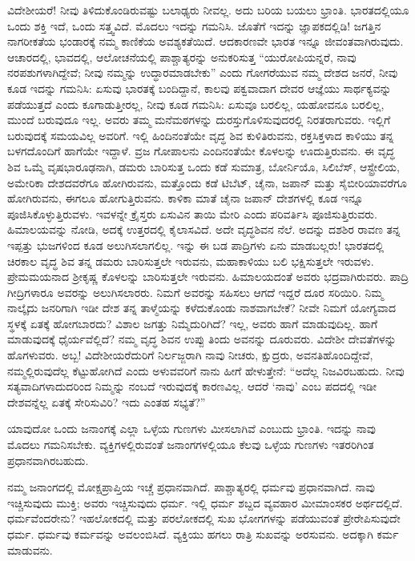 ವಿದೇಶೀಯರೆ! ನೀವು ತಿಳಿದುಕೊಂಡಿರುವಷ್ಟು ಬಲಾಢ್ಯರು ನೀವಲ್ಲ. ಅದು ಬರಿಯ ಬಯಲು ಭ್ರಾಂತಿ. ಭಾರತದಲ್ಲಿಯೂ ಒಂದು ಶಕ್ತಿ ಇದೆ, ಒಂದು ಸತ್ತ್ವವಿದೆ. ಮೊದಲು ಇದನ್ನು ಗಮನಿಸಿ. ಜೊತೆಗೆ ಇದನ್ನು ಜ್ಞಾಪಕದಲ್ಲಿಡಿ! ಜಗತ್ತಿನ ನಾಗರೀಕತೆಯ ಭಂಡಾರಕ್ಕೆ ನಮ್ಮ ಕಾಣಿಕೆಯ ಅವಶ್ಯಕತೆಯಿದೆ. ಆದಕಾರಣವೇ ಭಾರತ ಇನ್ನೂ ಜೀವಂತವಾಗಿರುವುದು. ಆಚಾರದಲ್ಲಿ, ಭಾವದಲ್ಲಿ, ಆಲೋಚನೆಯಲ್ಲಿ ಪಾಶ್ಚಾತ್ಯರನ್ನು ಅನುಕರಿಸುತ್ತ “ಯುರೋಪಿ\break ಯನ್ನರೆ, ನಾವು ನರಪಶುಗಳಾಗಿದ್ದೇವೆ; ನೀವು ನಮ್ಮನ್ನು ಉದ್ಧಾರಮಾಡಬೇಕು” ಎಂದು ಗೋಗರೆಯುವ ನಮ್ಮ ದೇಶದ ಜನರೆ, ನೀವು ಕೂಡ ಇದನ್ನು ಗಮನಿಸಿ: ಏಸುವು ಭಾರತಕ್ಕೆ ಬಂದಿದ್ದಾನೆ, ಕಾಲವು ಪಕ್ವವಾದಾಗ ದೇವರ ಆಜ್ಞೆಯು ಸಾರ್ಥಕ್ಯವನ್ನು ಪಡೆಯುತ್ತದೆ ಎಂದು ಕೂಗಾಡುತ್ತೀರಲ್ಲ, ನೀವು ಕೂಡ ಗಮನಿಸಿ: ಏಸುವೂ ಬರಲಿಲ್ಲ, ಯಹೋವನೂ ಬರಲಿಲ್ಲ, ಮುಂದೆ ಬರುವುದೂ ಇಲ್ಲ. ಅವರು ತಮ್ಮ ಮನೆಮಠಗಳನ್ನು ದುರಸ್ತುಗೊಳಿಸು\break ವುದರಲ್ಲಿ ನಿರತರಾಗುವರು. ಇಲ್ಲಿಗೆ ಬರುವುದಕ್ಕೆ ಸಮಯವಿಲ್ಲ ಅವರಿಗೆ. ಇಲ್ಲಿ ಹಿಂದಿನಂತೆಯೇ ವೃದ್ಧ ಶಿವ ಕುಳಿತಿರುವನು, ರಕ್ತಸಿಕ್ತಳಾದ ಕಾಳಿಯು ತನ್ನ ಬಳಗದೊಂದಿಗೆ ಹಾಗೆಯೇ ಇದ್ದಾಳೆ. ವ್ರಜ ಗೋಪಾಲನು ಎಂದಿನಂತೆಯೇ ಕೊಳಲನ್ನು ಊದುತ್ತಿರುವನು. ಈ ವೃದ್ಧ ಶಿವ ಒಮ್ಮೆ ವೃಷಭಾರೂಢನಾಗಿ, ಡಮರು ಬಾರಿಸುತ್ತ ಒಂದು ಕಡೆ ಸುಮಾತ್ರ, ಬೋರ್ನಿಯೊ, ಸಿಲಿಬೆಸ್​, ಆಸ್ಟ್ರೇಲಿಯ, ಅಮೇರಿಕಾ ದೇಶದವರೆಗೂ ಹೋಗಿರುವನು, ಮತ್ತೊಂದು ಕಡೆ ಟಿಬೆಟ್​, ಚೈನಾ, ಜಪಾನ್​ ಮತ್ತು ಸೈಬೀರಿಯಾವರೆಗೂ ಹೋಗಿರುವನು, ಈಗಲೂ ಹೋಗುತ್ತಿರುವನು. ಕಾಳಿಕಾ ಮಾತೆ ಚೈನಾ ಜಪಾನ್​ ದೇಶಗಳಲ್ಲಿ ಕೂಡ ಇನ್ನೂ ಪೂಜಿಸಿಕೊಳ್ಳುತ್ತಿರುವಳು. ಇವಳನ್ನೇ ಕ್ರೈಸ್ತರು ಏಸುವಿನ ತಾಯಿ ಮೇರಿ ಎಂದು ಪರಿವರ್ತಿಸಿ ಪೂಜಿಸುತ್ತಿರುವರು. ಹಿಮಾಲಯವನ್ನು ನೋಡಿ, ಅದಕ್ಕೆ ಉತ್ತರದಲ್ಲಿ ಕೈಲಾಸವಿದೆ. ಅದೇ ವೃದ್ಧಶಿವನ ನೆಲೆ. ಅದನ್ನು ದಶಶಿರ ರಾವಣ ತನ್ನ ಇಪ್ಪತ್ತು ಭುಜಗಳಿಂದ ಕೂಡ ಅಲುಗಿಸಲಾಗ\break ಲಿಲ್ಲ. ಇನ್ನು ಈ ಬಡ ಪಾದ್ರಿಗಳು ಏನು ಮಾಡಬಲ್ಲರು! ಭಾರತದಲ್ಲಿ ಚಿರಕಾಲ ವೃದ್ಧ ಶಿವ ತನ್ನ ಡಮರು ಬಾರಿಸುತ್ತಲೇ ಇರುವನು, ಮಹಾಕಾಳಿಯು ಬಲಿ ಭಕ್ಷಿಸುತ್ತಲೇ ಇರುವಳು. ಪ್ರೇಮಮಯನಾದ ಶ‍್ರೀಕೃಷ್ಣ ಕೊಳಲನ್ನು ಬಾರಿಸುತ್ತಲೇ ಇರುವನು. ಹಿಮಾಲಯದಂತೆ ಅವರು ಭದ್ರವಾಗಿರುವರು. ಪಾದ್ರಿ ಗೀದ್ರಿಗಳಾರೂ ಅವರನ್ನು ಅಲುಗಿಸಲಾರರು. ನಿಮಗೆ ಅವರನ್ನು ಸಹಿಸಲು ಆಗದೆ ಇದ್ದರೆ ದೂರ ಸರಿಯಿರಿ. ನಿಮ್ಮ ನಾಲ್ಕೈದು ಜನರಿಗಾಗಿ ಇಡೀ ದೇಶ ತನ್ನ ತಾಳ್ಮೆಯನ್ನು ಕಳೆದುಕೊಂಡು ನಾಶವಾಗಬೇಕೆ? ನೀವೇ ನಿಮಗೆ ಯೋಗ್ಯವಾದ ಸ್ಥಳಕ್ಕೆ ಏತಕ್ಕೆ ಹೋಗಬಾರದು? ವಿಶಾಲ ಜಗತ್ತು ನಿಮ್ಮೆದುರಿಗಿದೆ? ಇಲ್ಲ, ಅವರು ಹಾಗೆ ಮಾಡುವುದಿಲ್ಲ. ಹಾಗೆ ಮಾಡುವುದಕ್ಕೆ ಧೈರ್ಯವೆಲ್ಲಿದೆ? ನಮ್ಮ ವೃದ್ಧ ಶಿವನ ಉಪ್ಪು ತಿಂದು ಅವನನ್ನು ದೂರುವರು. ವಿದೇಶೀ ದೇವತೆಗಳನ್ನು ಹೊಗಳುವರು. ಅಬ್ಬ! ವಿದೇಶೀಯರೆದುರಿಗೆ ನಿರ್ಲಜ್ಜರಾಗಿ ನಾವು ನೀಚರು, ಕ್ಷುದ್ರರು, ಅವನತಿಹೊಂದಿದ್ದೇವೆ, ನಮ್ಮಲ್ಲಿರುವುದೆಲ್ಲ ಕೆಟ್ಟುಹೋಗಿದೆ ಎಂದು ಅಳುವವರಿಗೆ ನಾನು ಹೀಗೆ ಹೇಳುತ್ತೇನೆ: “ಅದೆಲ್ಲ ನಿಜವಿರಬಹುದು. ನೀವು ಸತ್ಯವಾದಿಗಳಾದುದರಿಂದ ನಿಮ್ಮನ್ನು ನಂಬದೆ ಇರುವುದಕ್ಕೆ ಕಾರಣವಿಲ್ಲ. ಆದರೆ ‘ನಾವು’ ಎಂಬ ಪದದಲ್ಲಿ ಇಡೀ ದೇಶವನ್ನೆಲ್ಲ ಏತಕ್ಕೆ ಸೇರಿಸುವಿರಿ? ಇದು ಎಂತಹ ಸಭ್ಯತೆ?”

ಯಾವುದೋ ಒಂದು ಜನಾಂಗಕ್ಕೆ ಎಲ್ಲಾ ಒಳ್ಳೆಯ ಗುಣಗಳು ಮೀಸಲಾಗಿವೆ ಎಂಬುದು ಭ್ರಾಂತಿ. ಇದನ್ನು ನಾವು ಮೊದಲು ಗಮನಿಸಬೇಕು. ವ್ಯಕ್ತಿಗಳಲ್ಲಿರುವಂತೆ ಜನಾಂಗಗಳಲ್ಲಿಯೂ ಕೆಲವು ಒಳ್ಳೆಯ ಗುಣಗಳು ಇತರರಿಗಿಂತ ಪ್ರಧಾನವಾಗಿರಬಹುದು.

ನಮ್ಮ ಜನಾಂಗದಲ್ಲಿ ಮೋಕ್ಷಪ್ರಾಪ್ತಿಯ ಇಚ್ಚೆ ಪ್ರಧಾನವಾಗಿದೆ. ಪಾಶ್ಚಾತ್ಯರಲ್ಲಿ ಧರ್ಮವು ಪ್ರಧಾನವಾಗಿದೆ. ನಾವು ಇಚ್ಚಿಸುವುದು ಮುಕ್ತಿ; ಅವರು ಇಚ್ಚಿಸುವುದು ಧರ್ಮ. ಇಲ್ಲಿ ಧರ್ಮ ಶಬ್ದದ ವ್ಯವಹಾರ ಮೀಮಾಂಸಕರ ಅರ್ಥದಲ್ಲಿದೆ. ಧರ್ಮವೆಂದರೇನು? ಇಹಲೋಕದಲ್ಲಿ ಮತ್ತು ಪರಲೋಕದಲ್ಲಿ ಸುಖ ಭೋಗಗಳನ್ನು ಪಡೆಯುವಂತೆ ಪ್ರೇರೇಪಿಸುವುದೇ ಧರ್ಮ. ಧರ್ಮವು ಕರ್ಮವನ್ನು ಅವಲಂಬಿಸಿದೆ. ವ್ಯಕ್ತಿಯು ಹಗಲು ರಾತ್ರಿ ಸುಖವನ್ನು ಅರಸುವನು. ಅದಕ್ಕಾಗಿ ಕರ್ಮ ಮಾಡುವನು.


